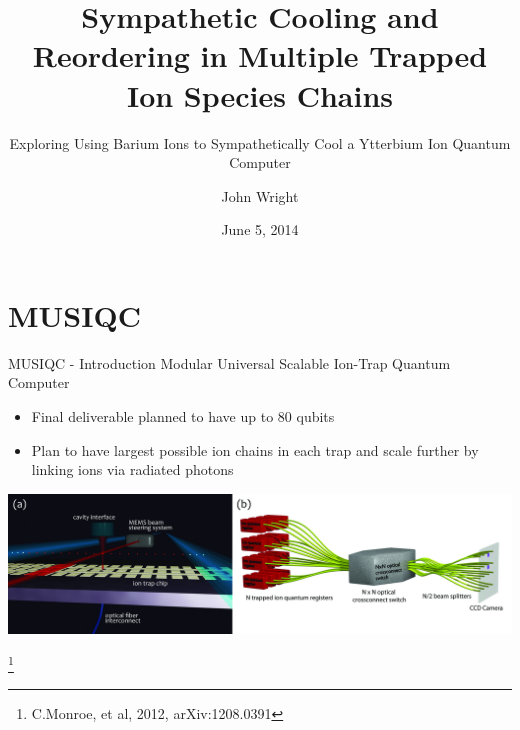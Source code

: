 \documentclass{beamer}
\title[Sympathetic Cooling Ba/Yb]{Sympathetic Cooling and Reordering in Multiple Trapped Ion Species Chains}
\subtitle{Exploring Using Barium Ions to Sympathetically Cool a Ytterbium Ion Quantum Computer}
\author[J. Wright]{John Wright}
\institute[UW] {
	Department of Physics \\
	University of Washington
}
\date[June 2014]{June 5, 2014}
\begin{document}
\begin{frame}[plain]
\titlepage
\end{frame}

\section{MUSIQC}
\begin{frame}{MUSIQC - Introduction}
Modular Universal Scalable Ion-Trap Quantum Computer
\begin{itemize}
	\item Final deliverable planned to have up to 80 qubits
	\item Plan to have largest possible ion chains in each trap	and scale further by linking ions via radiated photons
\end{itemize}
\centerline{\includegraphics[height=0.38\textheight]{MUSIQC-plan}}
\let\thefootnote\relax\footnote[frame]{C.Monroe, et al, 2012, arXiv:1208.0391}
\end{frame}
\end{document}
